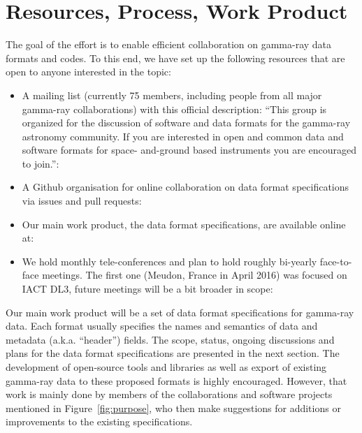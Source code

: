 \section{Resources, Process, Work Product}

The goal of the \gadf effort is to enable efficient collaboration on gamma-ray data formats and codes. To this end, we have set up the following resources that are open to anyone interested in the topic:

\begin{itemize}
\item{} A mailing list (currently 75 members, including people from all major gamma-ray collaborations) with this official description: ``This group is organized for the discussion of software and data formats for the gamma-ray astronomy community. If you are interested in open and common data and software formats for space- and-ground based instruments you are encouraged to join.'': \\ \ogralist
\item{}A Github organisation for online collaboration on data format specifications via issues and pull requests:\\ \gadfgithub
\item{}Our main work product, the data format specifications, are available online at:\\ \gadfrtd
\item{}We hold monthly tele-conferences and plan to hold roughly bi-yearly face-to-face meetings. The first one (Meudon, France in April 2016) was focused on IACT DL3, future meetings will be a bit broader in scope: \ogrameudon
\end{itemize}

Our main work product will be a set of data format specifications for gamma-ray data. Each format usually specifies the names and semantics of data and metadata (a.k.a. ``header'') fields. The scope, status, ongoing discussions and plans for the data format specifications are presented in the next section. The development of open-source tools and libraries as well as export of existing gamma-ray data to these proposed formats is highly encouraged. However, that work is mainly done by members of the collaborations and software projects mentioned in Figure~\ref{fig:purpose}, who then make suggestions for additions or improvements to the existing specifications.

